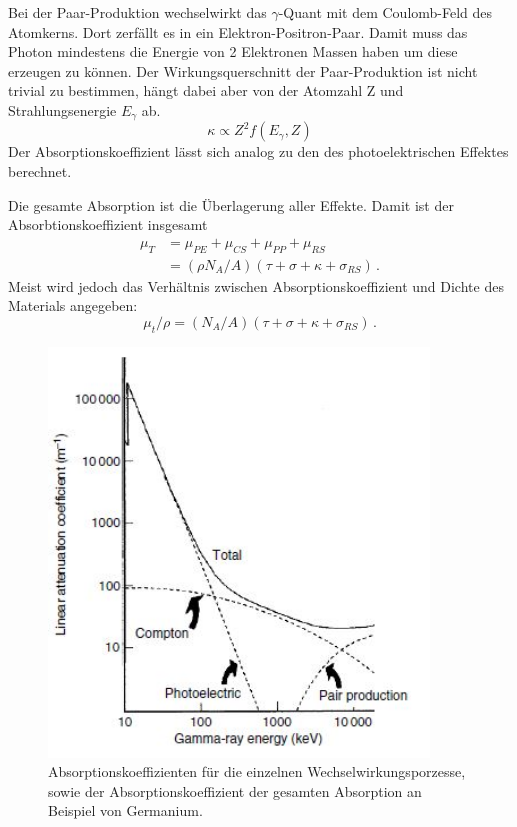 Bei der Paar-Produktion wechselwirkt das $\gamma$-Quant mit dem Coulomb-Feld des Atomkerns. Dort zerfällt es  in ein Elektron-Positron-Paar. Damit muss das Photon mindestens die Energie von 2 Elektronen Massen haben um diese erzeugen zu können.
Der Wirkungsquerschnitt der Paar-Produktion ist nicht trivial zu bestimmen, hängt dabei aber von der Atomzahl Z und Strahlungsenergie $E_\gamma$ ab.
\begin{equation*}
    \kappa \propto Z^2f(E_\gamma, Z) 
\end{equation*}
Der Absorptionskoeffizient lässt sich analog zu den des photoelektrischen Effektes berechnet.

Die gesamte Absorption ist die Überlagerung aller Effekte. Damit ist der Absorbtionskoeffizient insgesamt
\begin{align}
    \mu_T &= \mu_{PE} + \mu_{CS} + \mu_{PP} + \mu_{RS} \\
        &  =(\rho  N_A/A) (\tau + \sigma + \kappa + \sigma_{RS}) \,.
\end{align}
Meist wird jedoch das Verhältnis zwischen Absorptionskoeffizient und Dichte des Materials angegeben:
\begin{equation}
    \mu_t / \rho = (N_A/A)(\tau + \sigma + \kappa + \sigma_{RS}) \,.
\end{equation}

\begin{figure}
    \centering
    \includegraphics[width=0.9\textwidth]{content/attenuation.jpg}
    \caption{Absorptionskoeffizienten für die einzelnen Wechselwirkungsporzesse, sowie der Absorptionskoeffizient der gesamten Absorption an Beispiel von Germanium. \cite{Gilmore}}
    \label{fig:plot}
\end{figure}

